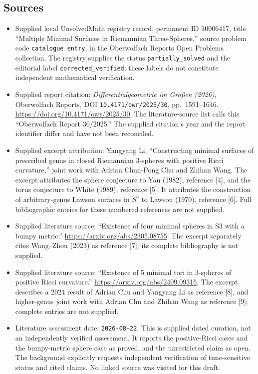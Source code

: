 \documentclass[11pt]{article}
\begin{document}
\subsection{Sources}
\begin{itemize}
\item Supplied local UnsolvedMath registry record, permanent ID \(30006417\), title ``Multiple Minimal Surfaces in Riemannian Three-Spheres,'' source problem code \texttt{catalogue entry}, in the Oberwolfach Reports Open Problems collection. The registry supplies the status \texttt{partially\_solved} and the editorial label \texttt{corrected\_verified}; these labels do not constitute independent mathematical verification.
\item Supplied report citation: \emph{Differentialgeometrie im Großen (2026)}, Oberwolfach Reports, DOI \texttt{10.4171/owr/2025/30}, pp.\ 1591--1646. \url{https://doi.org/10.4171/owr/2025/30}. The literature-source list calls this ``Oberwolfach Report 30/2025.'' The supplied citation's year and the report identifier differ and have not been reconciled.
\item Supplied excerpt attribution: Yangyang Li, ``Constructing minimal surfaces of prescribed genus in closed Riemannian 3-spheres with positive Ricci curvature,'' joint work with Adrian Chun-Pong Chu and Zhihan Wang. The excerpt attributes the sphere conjecture to Yau (1982), reference [4], and the torus conjecture to White (1989), reference [5]. It attributes the construction of arbitrary-genus Lawson surfaces in \(S^3\) to Lawson (1970), reference [6]. Full bibliographic entries for these numbered references are not supplied.
\item Supplied literature source: ``Existence of four minimal spheres in S3 with a bumpy metric.'' \url{https://arxiv.org/abs/2305.08755}. The excerpt separately cites Wang--Zhou (2023) as reference [7]; its complete bibliography is not supplied.
\item Supplied literature source: ``Existence of 5 minimal tori in 3-spheres of positive Ricci curvature.'' \url{https://arxiv.org/abs/2409.09315}. The excerpt describes a 2024 result of Adrian Chu and Yangyang Li as reference [8], and higher-genus joint work with Adrian Chu and Zhihan Wang as reference [9]; complete entries are not supplied.
\item Literature assessment date: \texttt{2026-08-22}. This is supplied dated curation, not an independently verified assessment. It reports the positive-Ricci cases and the bumpy-metric sphere case as proved, and the unrestricted claim as open. The background explicitly requests independent verification of time-sensitive status and cited claims. No linked source was visited for this draft.
\end{itemize}
\end{document}
